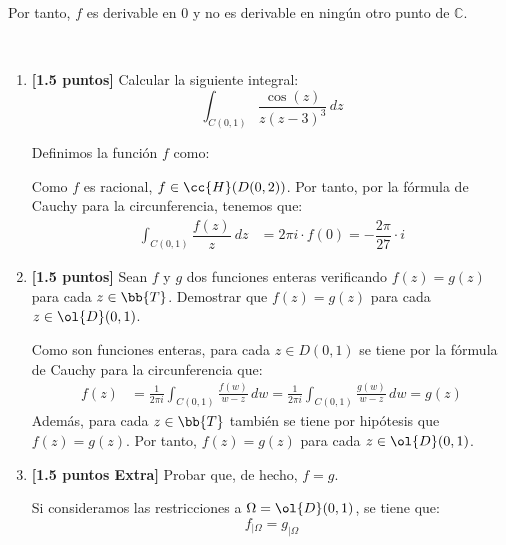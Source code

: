 \documentclass[12pt]{article}
\begin{document}
\begin{ejercicio}[3 puntos]
\begin{description}
        Por tanto, $f$ es derivable en $0$ y no es derivable en ningún otro punto de $\mathbb{C}$.        
        \end{description}
    \end{ejercicio}

    \begin{ejercicio}[3 puntos]~
        \begin{enumerate}
            \item \textbf{[1.5 puntos]} Calcular la siguiente integral:
            \begin{equation*}
                \int_{C(0,1)} \frac{\cos(z)}{z(z-3)^3} \, dz
            \end{equation*}

            Definimos la función $f$ como:

            Como $f$ es racional, $f\in \cc{H}(D(0,2))$. Por tanto, por la fórmula de Cauchy para la circunferencia, tenemos que:
            \begin{align*}
                \int_{C(0,1)} \dfrac{f(z)}{z}\ dz &= 2\pi i \cdot f(0)=-\dfrac{2\pi}{27}\cdot i
            \end{align*}
            \item \textbf{[1.5 puntos]} Sean $f$ y $g$ dos funciones enteras verificando $f(z) = g(z)$ para cada $z \in \bb{T}$. Demostrar que $f(z) = g(z)$ para cada $z \in \ol{D}(0, 1)$.
            
            Como son funciones enteras, para cada $z\in D(0,1)$ se tiene por la fórmula de Cauchy para la circunferencia que:
            \begin{align*}
                f(z) &= \frac{1}{2\pi i} \int_{C(0,1)} \frac{f(w)}{w-z} \, dw
                = \frac{1}{2\pi i} \int_{C(0,1)} \frac{g(w)}{w-z} \, dw
                = g(z)
            \end{align*}
            Además, para cada $z\in \bb{T}$ también se tiene por hipótesis que $f(z)=g(z)$. Por tanto, $f(z)=g(z)$ para cada $z\in \ol{D}(0,1)$.
            \item \textbf{[1.5 puntos Extra]} Probar que, de hecho, $f = g$.
            
            Si consideramos las restricciones a $\Omega=\ol{D}(0,1)$, se tiene que:
            \begin{equation*}
                f_{\big| \Omega} = g_{\big| \Omega}
            \end{equation*}


\end{enumerate}
\end{ejercicio}
\end{document}
